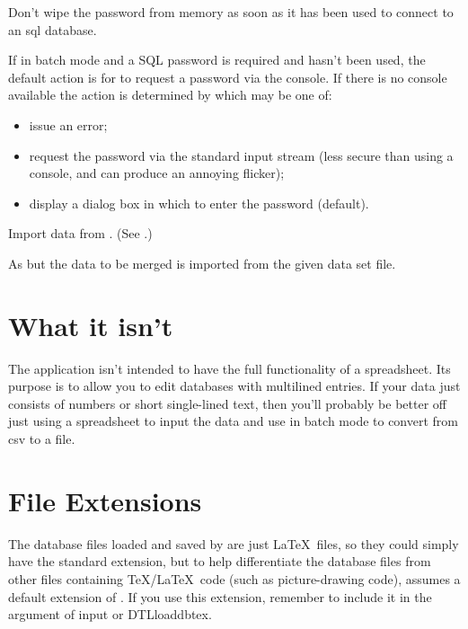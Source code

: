 Don't wipe the password from memory as soon as it 
has been used to connect to an \gls{sql} database.

If in batch mode and a SQL password is required
and  hasn't been used, the
default action is for  to request a password
via the console. If there is no console available
the action is determined by 
which may be one of:
\begin{itemize}
  \item {} issue an error;
  \item {} request the password via the standard
  input stream (less secure than using a console, and can produce 
  an annoying flicker);
  \item {} display a dialog box in which to enter the password (default).
\end{itemize}

Import  data from .
(See .)

As  but the data to be merged is imported from the
given  data set file.

\section{What it isn't}
\label{sec:notaspreadsheet}

The  application isn't intended to have the full functionality of
a spreadsheet. Its purpose is to allow you to edit 
 databases with multilined entries. If your data 
just consists of numbers or short single-lined text, then you'll probably 
be better off just using a spreadsheet to input the data and 
use  in batch mode to convert from \gls{csv} to 
a  file.

\section{File Extensions}
\label{sec:fileext}

The  database files loaded and saved by 
are just \LaTeX\ files, so they could simply have the standard
 extension, but to help differentiate the database files
from other files containing \TeX\slash \LaTeX\ code (such as picture-drawing
code),  assumes a default extension of .
If you use this extension, remember to include it in the argument of
\gls{input} or \gls{DTLloaddbtex}.

